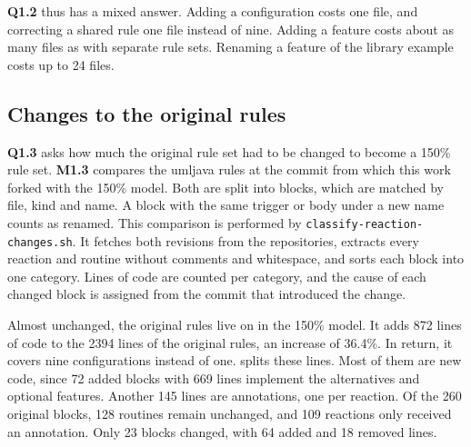 \textbf{Q1.2} thus has a mixed answer.
Adding a configuration costs one file, and correcting a shared rule one file instead of nine.
Adding a feature costs about as many files as with separate rule sets.
Renaming a feature of the library example costs up to 24 files.

\subsection{Changes to the original rules}
\label{sec:Evaluation:AnnotationMechanism:ChangesToTheOriginalRules}

\textbf{Q1.3} asks how much the original rule set had to be changed to become a 150\% rule set.
\textbf{M1.3} compares the umljava rules at the commit from which this work forked with the 150\% model.
Both are split into blocks, which are matched by file, kind and name.
A block with the same trigger or body under a new name counts as renamed.
This comparison is performed by \texttt{classify-reaction-changes.sh}.
It fetches both revisions from the repositories, extracts every reaction and routine without comments and whitespace, and sorts each block into one category.
Lines of code are counted per category, and the cause of each changed block is assigned from the commit that introduced the change.

Almost unchanged, the original rules live on in the 150\% model.
It adds 872 lines of code to the 2394 lines of the original rules, an increase of 36.4\%.
In return, it covers nine configurations instead of one.
 splits these lines.
Most of them are new code, since 72 added blocks with 669 lines implement the alternatives and optional features.
Another 145 lines are annotations, one per reaction.
Of the 260 original blocks, 128 routines remain unchanged, and 109 reactions only received an annotation.
Only 23 blocks changed, with 64 added and 18 removed lines.

